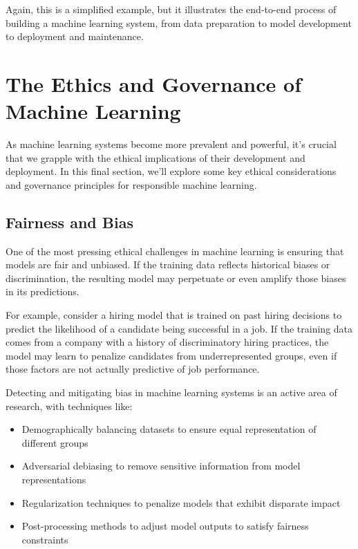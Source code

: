 \documentclass[
  9pt,
  letterpaper,
  abstract,
  titlepage]{scrbook}
\begin{document}
Again, this is a simplified example, but it illustrates the end-to-end
process of building a machine learning system, from data preparation to
model development to deployment and maintenance.

\section{The Ethics and Governance of Machine
Learning}\label{the-ethics-and-governance-of-machine-learning}

As machine learning systems become more prevalent and powerful, it's
crucial that we grapple with the ethical implications of their
development and deployment. In this final section, we'll explore some
key ethical considerations and governance principles for responsible
machine learning.

\subsection{Fairness and Bias}\label{fairness-and-bias}

One of the most pressing ethical challenges in machine learning is
ensuring that models are fair and unbiased. If the training data
reflects historical biases or discrimination, the resulting model may
perpetuate or even amplify those biases in its predictions.

For example, consider a hiring model that is trained on past hiring
decisions to predict the likelihood of a candidate being successful in a
job. If the training data comes from a company with a history of
discriminatory hiring practices, the model may learn to penalize
candidates from underrepresented groups, even if those factors are not
actually predictive of job performance.

Detecting and mitigating bias in machine learning systems is an active
area of research, with techniques like:

\begin{itemize}
\item
  Demographically balancing datasets to ensure equal representation of
  different groups
\item
  Adversarial debiasing to remove sensitive information from model
  representations
\item
  Regularization techniques to penalize models that exhibit disparate
  impact
\item
  Post-processing methods to adjust model outputs to satisfy fairness
  constraints
\end{itemize}
\end{document}
